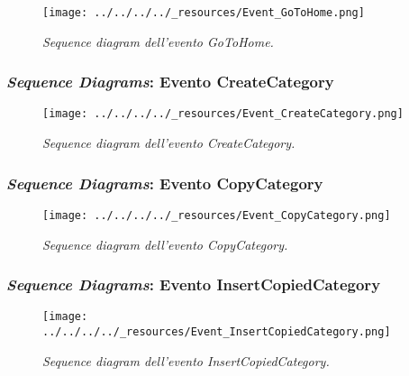 \begin{figure}
\centering
\texttt{[image: ../../../../\_resources/Event\_GoToHome.png]}
\caption{\emph{Sequence diagram dell'evento GoToHome.}}
\end{figure}

\pagebreak

\hypertarget{sequence-diagrams-evento-createcategory}{%
\subsubsection{\texorpdfstring{\emph{Sequence Diagrams}: Evento
CreateCategory}{Sequence Diagrams: Evento CreateCategory}}\label{sequence-diagrams-evento-createcategory}}

\begin{figure}
\centering
\texttt{[image: ../../../../\_resources/Event\_CreateCategory.png]}
\caption{\emph{Sequence diagram dell'evento CreateCategory.}}
\end{figure}

\pagebreak

\hypertarget{sequence-diagrams-evento-copycategory}{%
\subsubsection{\texorpdfstring{\emph{Sequence Diagrams}: Evento
CopyCategory}{Sequence Diagrams: Evento CopyCategory}}\label{sequence-diagrams-evento-copycategory}}

\begin{figure}
\centering
\texttt{[image: ../../../../\_resources/Event\_CopyCategory.png]}
\caption{\emph{Sequence diagram dell'evento CopyCategory.}}
\end{figure}

\pagebreak

\hypertarget{sequence-diagrams-evento-insertcopiedcategory}{%
\subsubsection{\texorpdfstring{\emph{Sequence Diagrams}: Evento
InsertCopiedCategory}{Sequence Diagrams: Evento InsertCopiedCategory}}\label{sequence-diagrams-evento-insertcopiedcategory}}

\begin{figure}
\centering
\texttt{[image: ../../../../\_resources/Event\_InsertCopiedCategory.png]}
\caption{\emph{Sequence diagram dell'evento InsertCopiedCategory.}}
\end{figure}

